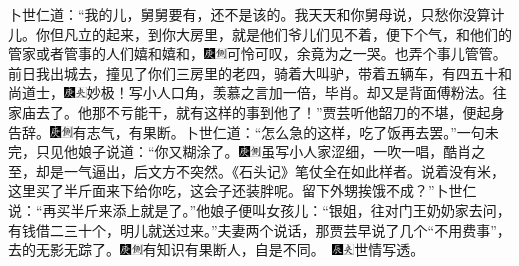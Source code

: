 卜世仁道：“我的儿，舅舅要有，还不是该的。我天天和你舅母说，只愁你没算计儿。你但凡立的起来，到你大房里，就是他们爷儿们见不着，便下个气，和他们的管家或者管事的人们嬉和嬉和，{\includegraphics[width=3mm]{../Images/00004}\includegraphics[width=3mm]{../Images/00011}\footnotesize \kaishu 可怜可叹，余竟为之一哭。}也弄个事儿管管。前日我出城去，撞见了你们三房里的老四，骑着大叫驴，带着五辆车，有四五十和尚道士，{\includegraphics[width=3mm]{../Images/00004}\includegraphics[width=3mm]{../Images/00012}\footnotesize \kaishu 妙极！写小人口角，羡慕之言加一倍，毕肖。却又是背面傅粉法。}往家庙去了。他那不亏能干，就有这样的事到他了！”贾芸听他韶刀的不堪，便起身告辞。{\includegraphics[width=3mm]{../Images/00004}\includegraphics[width=3mm]{../Images/00011}\footnotesize \kaishu 有志气，有果断。}卜世仁道：“怎么急的这样，吃了饭再去罢。”一句未完，只见他娘子说道：“你又糊涂了。{\includegraphics[width=3mm]{../Images/00004}\includegraphics[width=3mm]{../Images/00011}\footnotesize \kaishu 虽写小人家涩细，一吹一唱，酷肖之至，却是一气逼出，后文方不突然。《石头记》笔仗全在如此样者。}说着没有米，这里买了半斤面来下给你吃，这会子还装胖呢。留下外甥挨饿不成？”卜世仁说：“再买半斤来添上就是了。”他娘子便叫女孩儿：“银姐，往对门王奶奶家去问，有钱借二三十个，明儿就送过来。”夫妻两个说话，那贾芸早说了几个“不用费事”，去的无影无踪了。{{\includegraphics[width=3mm]{../Images/00004}\includegraphics[width=3mm]{../Images/00011}\footnotesize \kaishu 有知识有果断人，自是不同。}　\includegraphics[width=3mm]{../Images/00009}\includegraphics[width=3mm]{../Images/00012}\footnotesize \kaishu 世情写透。}

